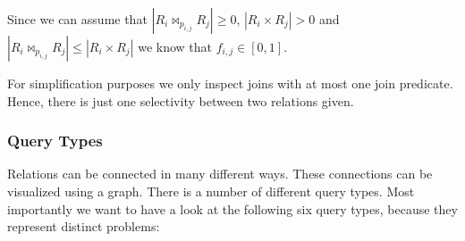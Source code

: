 \begin{commentary}
Since we can assume that $|R_i\Join_{p_{i,j}}R_j| \geq 0$, $|R_i \times R_j| > 0$ and $|R_i\Join_{p_{i,j}}R_j| \leq |R_i \times R_j|$ we know that $f_{i,j} \in [0,1]$.
\end{commentary}

For simplification purposes we only inspect joins with at most one join predicate. Hence, there is just one selectivity between two relations given. 
\newpage

\subsubsection{Query Types}
\label{subsub:query-types}

Relations can be connected in many different ways. These connections can be visualized using a graph. There is a number of different query types. Most importantly we want to have a look at the following six query types, because they represent distinct problems:

